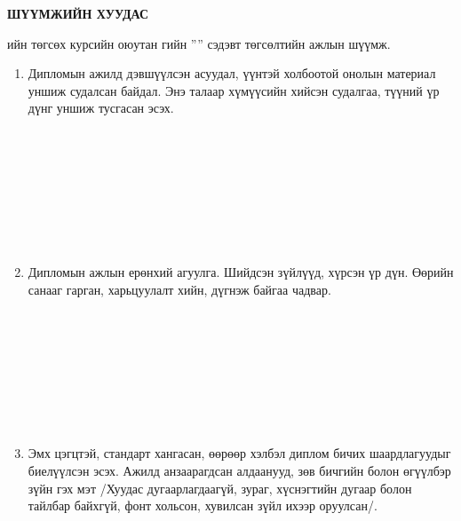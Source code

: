 \begin{titlepage}
\begin{center}

{\scshape\Large \univname\par} %
{\scshape\large \facname\par}\vspace{1cm} %

\textbf{{\Large ШҮҮМЖИЙН ХУУДАС}}\\[1cm]

\end{center}

\normalsize

\deptname{}ийн төгсөх курсийн оюутан \shortname{}гийн ''\ttitle'' сэдэвт төгсөлтийн ажлын шүүмж.

\begin{enumerate}
\item Дипломын ажилд дэвшүүлсэн асуудал, үүнтэй холбоотой онолын материал уншиж судалсан байдал. Энэ талаар хүмүүсийн хийсэн судалгаа, түүний үр дүнг уншиж тусгасан эсэх.
\begin{center}
\dotfill \\[0.1cm]
\dotfill \\[0.1cm]
\dotfill \\[0.1cm]
\dotfill \\[0.1cm]
\dotfill \\[0.1cm]
\dotfill \\[0.1cm]
\dotfill \\[0.4cm]
\end{center}
\item Дипломын ажлын ерөнхий агуулга. Шийдсэн зүйлүүд, хүрсэн үр дүн. Өөрийн санааг гарган, харьцуулалт хийн, дүгнэж байгаа чадвар.
\begin{center}
\dotfill \\[0.1cm]
\dotfill \\[0.1cm]
\dotfill \\[0.1cm]
\dotfill \\[0.1cm]
\dotfill \\[0.1cm]
\dotfill \\[0.1cm]
\dotfill \\[0.4cm]
\end{center}
\item Эмх цэгцтэй, стандарт хангасан, өөрөөр хэлбэл диплом бичих шаардлагуудыг биелүүлсэн эсэх. Ажилд анзаарагдсан алдаанууд, зөв бичгийн болон өгүүлбэр зүйн гэх мэт /Хуудас дугаарлагдаагүй, зураг, хүснэгтийн дугаар болон тайлбар байхгүй, фонт хольсон, хувилсан зүйл ихээр оруулсан/.

\end{enumerate}
\end{titlepage}
